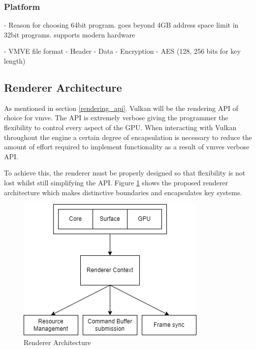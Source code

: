 \documentclass[11pt]{article}
\begin{document}
\subsubsection{Platform}
- Reason for choosing 64bit program.
    goes beyond 4GB address space limit in 32bit programs.
    supports modern hardware


- VMVE file format
-    Header
-    Data
- Encryption
- AES (128, 256 bits for key length)



\subsection{Renderer Architecture}

As mentioned in section \ref{rendering_api}. Vulkan will be the rendering API of choice
for \gls{vmve}. The API is extremely verbose giving the programmer the flexibility to
control every aspect of the GPU. When interacting with Vulkan throughout the engine
a certain degree of encapsulation is necessary to reduce the amount of effort required to 
implement functionality as a result of \glspl{vmve} verbose API.

To achieve this, the renderer must be properly designed so that flexibility is not lost
whilst still simplifying the API. Figure \ref{fig:rendererarch} shows the proposed renderer
architecture which makes distinctive boundaries and encapsulates key systems.

\begin{figure}[ht]
  \centering
  \includegraphics[width=\textwidth]{images/renderer_architecture.png}
  \caption{Renderer Architecture}
  \label{fig:rendererarch}
\end{figure}
\end{document}
